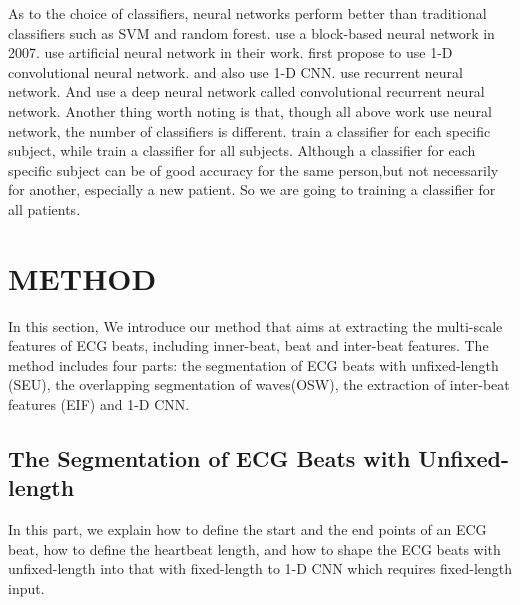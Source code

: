 \documentclass[wcp]{jmlr}
\begin{document}
As to the choice of classifiers, neural networks perform better than traditional classifiers such as SVM and random forest. \cite{jiang2007block} use a block-based neural network in 2007. \cite{abhinav2011clasification} use artificial neural network in their work. \cite{kiranyaz2016real} first propose to use 1-D convolutional neural network. \cite{zubair2016automated} and \cite{li2017classification} also use 1-D CNN. \cite{salloum2017ecg} use recurrent neural network. And \cite{limam2017atrial} use a deep neural network called convolutional recurrent neural network. Another thing worth noting is that, though all above work use neural network, the number of classifiers is different. \cite{kiranyaz2016real} train a classifier for each specific subject, while \cite{zubair2016automated} train a classifier for all subjects. Although a classifier for each specific subject can be of good accuracy for the same person,but not necessarily for another, especially a new patient. So we are going to training a classifier for all patients.
\section{METHOD}
In this section, We introduce our method that aims at extracting the multi-scale features of ECG beats, including inner-beat, beat and inter-beat features. The method includes four parts: the segmentation of ECG beats with unfixed-length (SEU), the overlapping segmentation of waves(OSW), the extraction of inter-beat features (EIF) and 1-D CNN.
\subsection{The Segmentation of ECG Beats with Unfixed-length}
In this part, we explain how to define the start and the end points of an ECG beat, how to define the heartbeat length, and how to shape the ECG beats with unfixed-length into that with fixed-length to 1-D CNN which requires fixed-length input.
\end{document}
